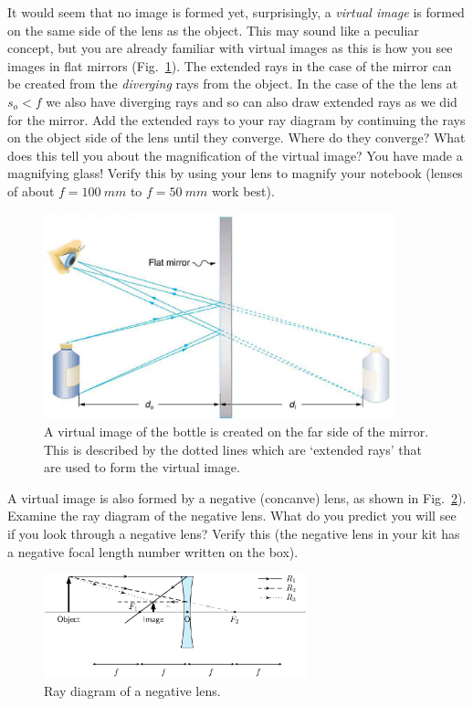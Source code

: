 \documentclass[a4paper]{report}
\begin{document}
It would seem that no image is formed yet, surprisingly, a \textit{virtual image} is formed on the same side of the lens as the object. 
This may sound like a peculiar concept, but you are already familiar with virtual images as this is how you see images in flat mirrors (Fig.~\ref{fig:mirror}). 
The extended rays in the case of the mirror can be created from the \textit{diverging} rays from the object. 
In the case of the the lens at $s_o<f$ we also have diverging rays and so can also draw extended rays as we did for the mirror. 
Add the extended rays to your ray diagram by continuing the rays on the object side of the lens until they converge. 
Where do they converge? 
What does this tell you about the magnification of the virtual image?
You have made a magnifying glass!
Verify this by using your lens to magnify your notebook (lenses of about $f=100~mm$ to $f=50~mm$ work best).
\begin{figure}[h]
\center
\includegraphics[width=4in]{virtual_image_mirr.eps}
\caption{A virtual image of the bottle is created on the far side of the mirror. 
This is described by the dotted lines which are `extended rays' that are used to form the virtual image. }
\label{fig:mirror}
\end{figure}

A virtual image is also formed by a negative (concanve) lens, as shown in Fig.~\ref{fig:neglens}). 
Examine the ray diagram of the negative lens. 
What do you predict you will see if you look through a negative lens?
Verify this (the negative lens in your kit has a negative focal length number written on the box). 
\begin{figure}[h]
\center
\includegraphics[width=3in]{negative_lens.eps}
\caption{Ray diagram of a negative lens.}
\label{fig:neglens}
\end{figure}
\end{document}
